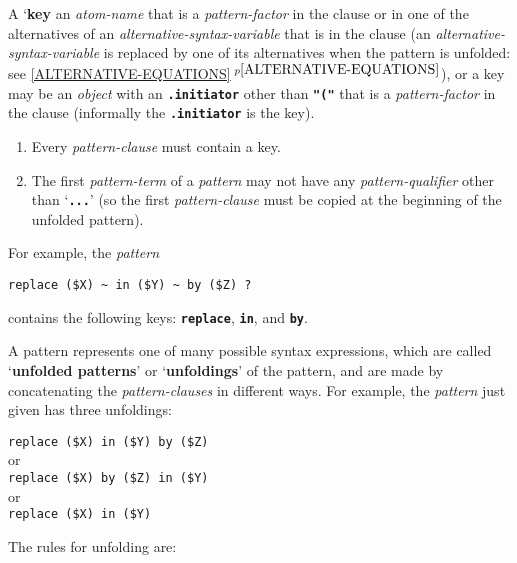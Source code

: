 \documentclass[12pt]{article}
\newcommand{\TT}[1]{{\tt \bfseries #1}}
\newcommand{\key}[1]{{\rm \bfseries #1}}
\newcommand{\itemref}[1]{\ref{#1}$\,^{p\pageref{#1}}$}
\begin{document}
A `\key{key}
an {\em atom-name} that is a {\em pattern-factor} in the clause
or in one of the alternatives of
an {\em alternative-syntax-variable} that is in the clause
(an {\em alternative-syntax-variable} is replaced by one of its
alternatives when the pattern is unfolded: see 
\itemref{ALTERNATIVE-EQUATIONS}),
or a key may be an {\em object} with an
\TT{.initiator} other than \TT{"("}
that is a {\em pattern-factor}
in the clause (informally the \TT{.initiator} is the key).

\begin{enumerate}

\item Every {\em pattern-clause} must contain a key.

\item The first {\em pattern-term} of a {\em pattern}
may not have any {\em pattern-qualifier} other than `\TT{...}'
(so the first {\em pattern-clause} must be copied at the beginning
of the unfolded pattern).

\end{enumerate}

For example, the {\em pattern}

\begin{center}
\verb/replace ($X) ~ in ($Y) ~ by ($Z) ?/
\end{center}

contains the following keys: \TT{replace}, \TT{in}, and \TT{by}.

A pattern represents one of many possible syntax expressions, which are
called `\key{unfolded patterns}' or `\key{unfoldings}' of the pattern,
and are made by concatenating the
{\em pattern-clauses} in different ways.  For example,
the {\em pattern} just given has three unfoldings:

\begin{center}
\verb/replace ($X) in ($Y) by ($Z)/ \\
or \\
\verb/replace ($X) by ($Z) in ($Y)/  \\
or \\
\verb/replace ($X) in ($Y)/ 
\end{center}

The rules for unfolding are:
\end{document}
